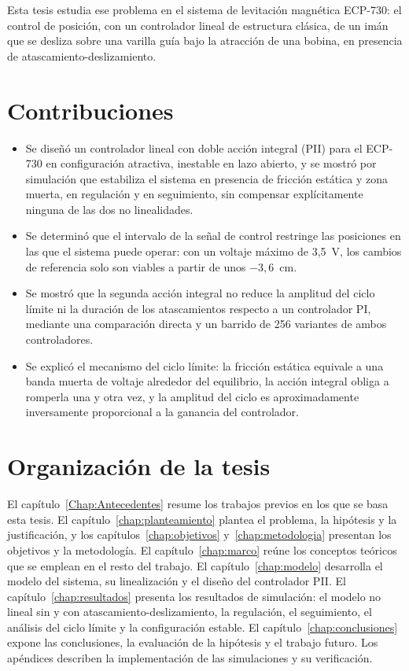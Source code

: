 Esta tesis estudia ese problema en el sistema de levitación magnética ECP-730: el control de posición, con un controlador lineal de estructura clásica, de un imán que se desliza sobre una varilla guía bajo la atracción de una bobina, en presencia de atascamiento-deslizamiento.

\section{Contribuciones}

\begin{itemize}
  \item Se diseñó un controlador lineal con doble acción integral (PII) para el ECP-730 en configuración atractiva, inestable en lazo abierto, y se mostró por simulación que estabiliza el sistema en presencia de fricción estática y zona muerta, en regulación y en seguimiento, sin compensar explícitamente ninguna de las dos no linealidades.
  \item Se determinó que el intervalo de la señal de control restringe las posiciones en las que el sistema puede operar: con un voltaje máximo de 3,5~V, los cambios de referencia solo son viables a partir de unos $-3{,}6$~cm.
  \item Se mostró que la segunda acción integral no reduce la amplitud del ciclo límite ni la duración de los atascamientos respecto a un controlador PI, mediante una comparación directa y un barrido de 256 variantes de ambos controladores.
  \item Se explicó el mecanismo del ciclo límite: la fricción estática equivale a una banda muerta de voltaje alrededor del equilibrio, la acción integral obliga a romperla una y otra vez, y la amplitud del ciclo es aproximadamente inversamente proporcional a la ganancia del controlador.
\end{itemize}

\section{Organización de la tesis}

El capítulo~\ref{Chap:Antecedentes} resume los trabajos previos en los que se basa esta tesis. El capítulo~\ref{chap:planteamiento} plantea el problema, la hipótesis y la justificación, y los capítulos~\ref{chap:objetivos} y~\ref{chap:metodologia} presentan los objetivos y la metodología. El capítulo~\ref{chap:marco} reúne los conceptos teóricos que se emplean en el resto del trabajo. El capítulo~\ref{chap:modelo} desarrolla el modelo del sistema, su linealización y el diseño del controlador PII. El capítulo~\ref{chap:resultados} presenta los resultados de simulación: el modelo no lineal sin y con atascamiento-deslizamiento, la regulación, el seguimiento, el análisis del ciclo límite y la configuración estable. El capítulo~\ref{chap:conclusiones} expone las conclusiones, la evaluación de la hipótesis y el trabajo futuro. Los apéndices describen la implementación de las simulaciones y su verificación.
